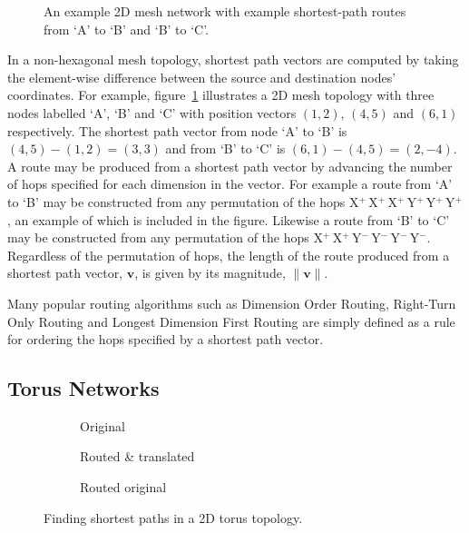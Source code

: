 		\begin{figure}
			\center
			\caption{An example 2D mesh network with example shortest-path routes
			from `A' to `B' and `B' to `C'.}
			\label{fig:mesh-topology-coordinates}
		\end{figure}
		
		In a non-hexagonal mesh topology, shortest path vectors are computed by
		taking the element-wise difference between the source and destination
		nodes' coordinates. For example, figure~\ref{fig:mesh-topology-coordinates}
		illustrates a 2D mesh topology with three nodes labelled `A', `B' and `C'
		with position vectors $(1, 2)$, $(4, 5)$ and $(6, 1)$ respectively. The
		shortest path vector from node `A' to `B' is $(4, 5) - (1, 2) = (3, 3)$ and
		from `B' to `C' is $(6, 1) - (4, 5) = (2, -4)$. A route may be produced
		from a shortest path vector by advancing the number of hops specified for
		each dimension in the vector.  For example a route from `A' to `B' may be
		constructed from any permutation of the hops
		X$^+\,$X$^+\,$X$^+\,$Y$^+\,$Y$^+\,$Y$^+$, an example of which is included
		in the figure. Likewise a route from `B' to `C' may be constructed from any
		permutation of the hops X$^+\,$X$^+\,$Y$^-\,$Y$^-\,$Y$^-\,$Y$^-$.
		Regardless of the permutation of hops, the length of the route produced
		from a shortest path vector, $\mathbf{v}$, is given by its magnitude,
		$\|\mathbf{v}\|$.
		
		Many popular routing algorithms such as Dimension Order Routing, Right-Turn
		Only Routing and Longest Dimension First Routing \cite{dally04,davies12}
		are simply defined as a rule for ordering the hops specified by a shortest
		path vector.
		
		\subsection{Torus Networks}
			
			\begin{figure}
				\center
				\begin{subfigure}{0.3\linewidth}
					\center
					\caption{Original}
					\label{fig:torus-shortest-path-example}
				\end{subfigure}
				\begin{subfigure}{0.3\linewidth}
					\center
					\caption{Routed \& translated}
					\label{fig:torus-shortest-path-translate}
				\end{subfigure}
				\begin{subfigure}{0.3\linewidth}
					\center
					\caption{Routed original}
					\label{fig:torus-shortest-path-routed}
				\end{subfigure}
				
				\caption{Finding shortest paths in a 2D torus topology.}
				\label{fig:torus-shortest-path}
			\end{figure}
			
